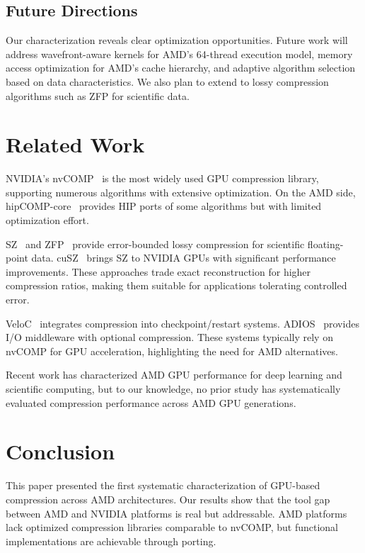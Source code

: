 \documentclass[runningheads]{llncs}
\begin{document}
\subsection{Future Directions}

Our characterization reveals clear optimization opportunities. Future work will address wavefront-aware kernels for AMD's 64-thread execution model, memory access optimization for AMD's cache hierarchy, and adaptive algorithm selection based on data characteristics. We also plan to extend to lossy compression algorithms such as ZFP for scientific data.


\section{Related Work}
\label{sec:related}

NVIDIA's nvCOMP~\cite{nvcomp} is the most widely used GPU compression library, supporting numerous algorithms with extensive optimization. On the AMD side, hipCOMP-core~\cite{hipcomp-core} provides HIP ports of some algorithms but with limited optimization effort.

SZ~\cite{sz} and ZFP~\cite{zfp} provide error-bounded lossy compression for scientific floating-point data. cuSZ~\cite{cusz} brings SZ to NVIDIA GPUs with significant performance improvements. These approaches trade exact reconstruction for higher compression ratios, making them suitable for applications tolerating controlled error.

VeloC~\cite{veloc} integrates compression into checkpoint/restart systems. ADIOS~\cite{adios} provides I/O middleware with optional compression. These systems typically rely on nvCOMP for GPU acceleration, highlighting the need for AMD alternatives.

Recent work has characterized AMD GPU performance for deep learning and scientific computing, but to our knowledge, no prior study has systematically evaluated compression performance across AMD GPU generations.


\section{Conclusion}
\label{sec:conclusion}

This paper presented the first systematic characterization of GPU-based compression across AMD architectures. Our results show that the tool gap between AMD and NVIDIA platforms is real but addressable. AMD platforms lack optimized compression libraries comparable to nvCOMP, but functional implementations are achievable through porting.
\end{document}
